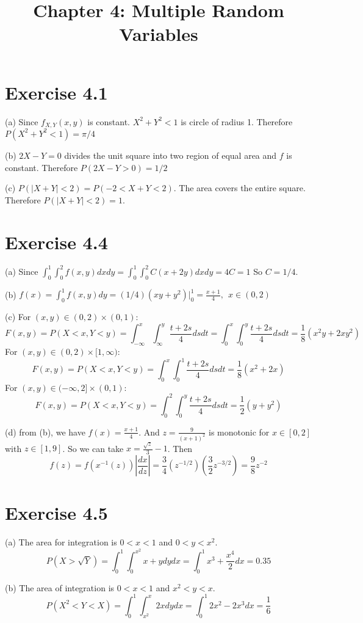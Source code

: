 \documentclass[12pt]{article}
\title{Chapter 4: Multiple Random Variables}
\begin{document}
\maketitle

\section*{Exercise 4.1}
(a) Since $f_{X,Y}(x,y)$ is constant. $X^2+Y^2<1$ is circle of radius 1. Therefore $P(X^2 + Y^2 < 1) = \pi/4$

(b) $2X-Y = 0$ divides the unit square into two region of equal area and $f$ is constant. Therefore $P(2X-Y > 0) = 1/2$

(c) $P(|X+Y|<2) = P (-2 < X + Y < 2)$. The area covers the entire square. Therefore $P(|X+Y|<2) = 1$.

\section*{Exercise 4.4}
(a) Since $\int_0^1 \int_0^2 f(x,y)dxdy  = \int_0^1 \int_0^2 C(x+2y) dx dy = 4C = 1$
So $C = 1/4$.

(b) $f(x) = \int^1_0 f(x,y)dy = (1/4) (xy + y^2)|^1_0 = \frac{x+1}{4}, \ \ x \in (0,2)$

(c) 
For $(x,y) \in (0,2)\times (0,1)$:
$$F(x, y) = P(X <x, Y <y) = \int_{-\infty}^{x} \int_{\infty}^{y} \frac{t+2s}{4} dsdt = \int_{0}^{x} \int_{0}^{y} \frac{t+2s}{4} dsdt =  \frac{1}{8}(x^2y + 2xy^2) $$
For $(x,y) \in (0,2) \times [1, \infty)$:
$$F(x, y) = P(X <x, Y <y) = \int_{0}^{x} \int_{0}^{1} \frac{t+2s}{4} dsdt = \frac{1}{8}(x^2 + 2x) $$
For $(x,y) \in (-\infty,2] \times (0,1)$:
$$F(x, y) = P(X <x, Y <y) = \int_{0}^{2} \int_{0}^{y} \frac{t+2s}{4} dsdt = \frac{1}{2}(y + y^2) $$



(d) from (b), we have $f(x) = \frac{x+1}{4}$. And $z = \frac{9}{(x+1)^2}$ is monotonic for $x\in[0,2]$ with $z\in[1, 9]$. So we can take $x = \frac{\sqrt{z}}{3} - 1$. Then $$f(z) = f(x^{-1}(z))\left|\frac{dx}{dz} \right| =  \frac{3}{4}(z^{-1/2}) (\frac{3}{2}z^{-3/2}) = \frac{9}{8}z^{-2}$$

\section*{Exercise 4.5}
(a) The area for integration is $0 < x < 1$ and $0 < y < x^2$. 
$$ P(X > \sqrt{Y}) = \int_0^1 \int_{0}^{x^2} x+ y dy dx =\int_0^1 x^3 + \frac{x^4}{2} dx = 0.35 $$

(b) The area of integration is $0 < x < 1$ and $x^2 < y < x$.
$$ P(X^2 <Y < X) = \int_0^1 \int_{x^2}^{x} 2x dy dx = \int_0^1 2x^2 - 2x^3 dx = \frac{1}{6}$$
\end{document}
